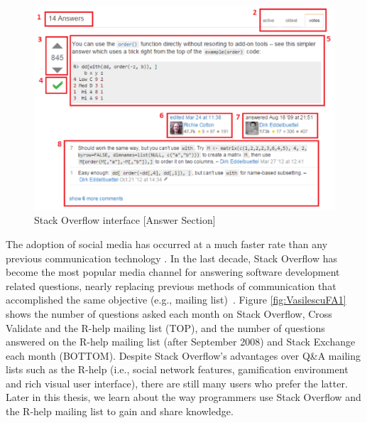 \documentclass{sig-alternate-05-2015}
\begin{document}
	\begin{figure}[!htb]
	\centering
	\includegraphics[width=0.8\columnwidth]{Figures/SOInterface_B}
	\caption{Stack Overflow interface [Answer Section]}
	\label{fig:SOInterface_B}
	\end{figure}

	The adoption of social media has occurred at a much faster rate than any previous communication technology \cite{Chui2012}.
	In the last decade, Stack Overflow has become the most popular media channel for answering software development related questions, nearly replacing previous methods of communication that accomplished the same objective (e.g., mailing list)~\cite{Vasilescu2014c}.
	Figure \ref{fig:VasilescuFA1} shows the number of questions asked each month on Stack Overflow, Cross Validate and the R-help mailing list (TOP), and the number of questions answered on the R-help mailing list (after September 2008) and Stack Exchange each month (BOTTOM).
	Despite Stack Overflow's advantages over Q\&A mailing lists such as the R-help (i.e., social network features, gamification environment and rich visual user interface), there are still many users who prefer the latter.
	Later in this thesis, we learn about the way programmers use Stack Overflow and the R-help mailing list to gain and share knowledge.
\end{document}
